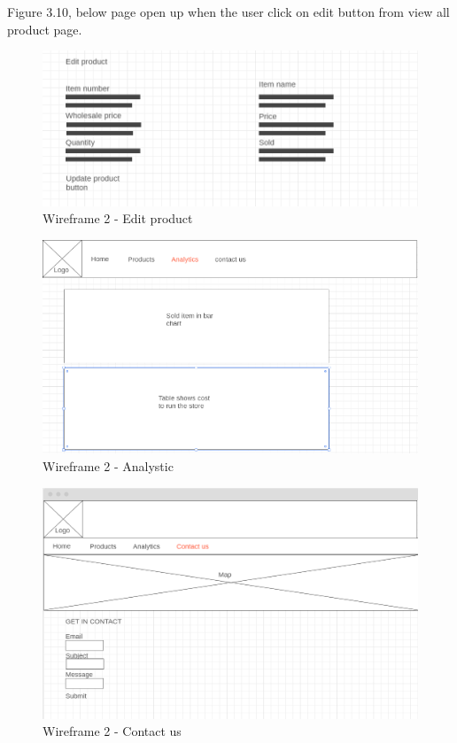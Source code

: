Figure 3.10, below page open up when the user click on edit button from view all product page. 
\begin{figure}[H]
\centering
    \includegraphics[scale=0.5]
    {wireframe2/editproduct.png}
    \caption{Wireframe 2 - Edit product}
    \label{fig:Wireframe 2 - Edit  product}
\end{figure}

\begin{figure}[H]
\centering
    \includegraphics[scale=0.5]
    {wireframe2/Analystic2.png}
    \caption{Wireframe 2 - Analystic}
    \label{fig:Wireframe 2 - Analystic}
\end{figure}

\begin{figure}[H]
\centering
    \includegraphics[scale=0.5]
    {wireframe2/contactus2.png}
    \caption{Wireframe 2 - Contact us}
    \label{fig:Wireframe 2 - contact us}
\end{figure}
 

